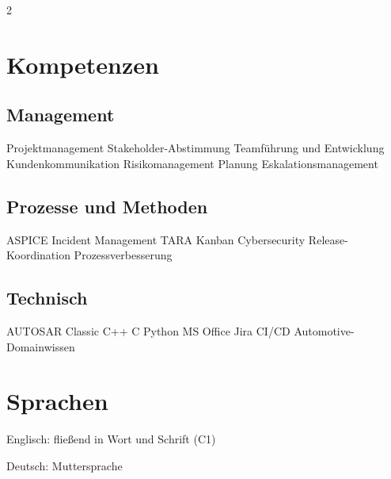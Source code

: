 \begin{paracol}{2}
%

\switchcolumn[1]


\section{Kompetenzen}
\subsection{Management}
\sectionsep
{}
Projektmanagement \textbullet{} Stakeholder-Abstimmung \textbullet{} Teamführung und Entwicklung \textbullet{} Kundenkommunikation \textbullet{}
Risikomanagement \textbullet{} Planung \textbullet{} Eskalationsmanagement \\
\sectionsep
\subsection{Prozesse und Methoden}
\sectionsep
ASPICE \textbullet{} Incident Management \textbullet{} TARA \textbullet{} Kanban \textbullet{} Cybersecurity \textbullet{}
Release-Koordination \textbullet{} Prozessverbesserung \\
\sectionsep
\subsection{Technisch}
\sectionsep
AUTOSAR Classic \textbullet{} C++ \textbullet{} C \textbullet{} Python \textbullet{} MS Office \textbullet{}
Jira \textbullet{} CI/CD \textbullet{} Automotive-Domainwissen \\
\sectionsep


\section{Sprachen}
\begin{tightemize}
\item Englisch: fließend in Wort und Schrift (C1)
\item Deutsch: Muttersprache
\end{tightemize}
\sectionsep



\end{paracol}
